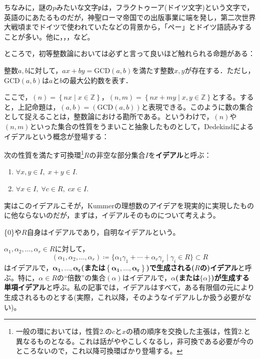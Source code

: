 ちなみに，謎の$p$みたいな文字$\mathfrak{p}$は，フラクトゥーア(ドイツ文字)という文字で，英語のにあたるものだが，神聖ローマ帝国での出版事業に端を発し，第二次世界大戦頃までドイツで使われていたなどの背景から，「ペー」とドイツ語読みすることが多い。他に，，，など。

ところで，初等整数論においては必ずと言って良いほど触れられる命題がある：
\begin{prop}
    整数$a, b$に対して，$ax+by=\mathrm{GCD}(a, b)$を満たす整数$x, y$が存在する．ただし，$\mathrm{GCD}(a ,b)$は$a$と$b$の最大公約数を表す．
\end{prop}
ここで，$(n)=\left\{nx\mid x\in\mathbb{Z}\right\}$，$(n, m)=\left\{nx+my\mid x, y\in\mathbb{Z}\right\}$とする。すると，上記命題は，$(a, b)=(\mathrm{GCD}(a, b))$と表現できる。このように数の集合として捉えることは，整数論における勘所である。というわけで，$(n)$や$(n, m)$といった集合の性質をうまいこと抽象したものとして，Dedekindによるイデアルという概念が登場する：

\begin{dfn}[イデアル]
    次の性質を満たす可換環\footnote{一般の環においては，性質2.の$c$と$x$の積の順序を交換した主張は，性質2.と異なるものとなる。これは話がややこしくなるし，非可換である必要が今のところないので，これ以降可換環ばかり登場する。}$R$の非空な部分集合$I$を\textbf{イデアル}と呼ぶ：
    \begin{enumerate}
        \item $\forall x, y\in I,\; x+y\in I$.
        \item $\forall x\in I,\; \forall c\in R,\; cx\in I$.
    \end{enumerate}
\end{dfn}
実はこのイデアルこそが，Kummerの理想数のアイデアを現実的に実現したものに他ならないのだが，まずは，イデアルそのものについて考えよう。

\{0\}や$R$自身はイデアルであり，自明なイデアルという。

$\alpha_1, \alpha_2,\ldots,\alpha_r\in R$に対して，\[
(\alpha_1, \alpha_2,\ldots,\alpha_r)\coloneqq \{\alpha_1\gamma_1+\cdots+\alpha_r\gamma_r\mid \gamma_i\in R\}\subset R
\]はイデアルで，\textbf{$\boldsymbol{\alpha_1,\ldots,\alpha_r}$(または$\boldsymbol{\left\{\alpha_1,\ldots,\alpha_r\right\}}$)で生成される($R$の)イデアル}と呼ぶ。特に，$\alpha\in R$の``倍数''の集合$(\alpha)$はイデアルで，\textbf{$\alpha$(または$\{\alpha\}$)が生成する単項イデアル}と呼ぶ。私の記事では，イデアルはすべて，ある有限個の元により生成されるものとする(実際，これ以降，そのようなイデアルしか扱う必要がない)。

